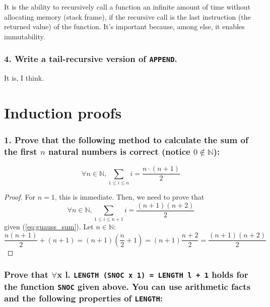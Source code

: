 \documentclass[10pt,a4paper]{article}
\begin{document}
It is the ability to recursively call a function an infinite amount of time without allocating memory (stack frame), if the recursive call is the last instruction (the returned value) of the function. It's important because, among else, it enables immutability.

\subsubsection*{4. Write a tail-recursive version of \texttt{APPEND}.}

It is, I think.

\section{Induction proofs}

\subsubsection*{1. Prove that the following method to calculate the sum of the first $n$ natural numbers is correct (notice $0 \not\in \mathbb{N}$):}

\begin{equation}
\label{eq:guauss_sum}
\forall{n}\in\mathbb{N}, \sum_{1 \leq i \leq n}{i} = \frac{n \cdot \left(n+1\right)}{2}
\end{equation}

\begin{proof}
For $n=1$, this is immediate. Then, we need to prove that
\begin{equation}
\label{eq:guauss_sum_np1}
\forall{n}\in\mathbb{N}, \sum_{1 \leq i \leq n + 1}{i} = \frac{\left(n+1\right) \left(n+2\right)}{2}
\end{equation}
given (\ref{eq:guauss_sum}). Let $n \in \mathbb{N}$:
\begin{equation*}
\frac{n\left(n+1\right)}{2}+\left(n+1\right)
= \left(n+1\right) \left(\frac{n}{2}+1\right)
= \left(n+1\right) \frac{n+2}{2}
= \frac{\left(n+1\right) \left(n+2\right)}{2}
\end{equation*}
\end{proof}

\subsubsection*{Prove that $\forall$x l. \texttt{LENGTH (SNOC x 1) = LENGTH l + 1} holds for the function \texttt{SNOC} given above. You can use arithmetic facts and the following properties of \texttt{LENGTH}:}
\end{document}
